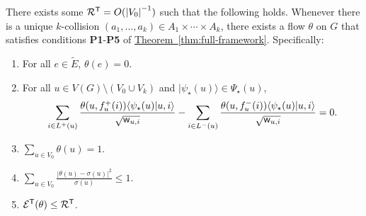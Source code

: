\documentclass{theoretics}
\newcommand{\thm}[1]{\hyperref[thm:#1]{Theorem~\ref*{thm:#1}}}
\def\ket#1{{\lvert}#1\rangle}
\renewcommand{\>}{\rangle}
\newcommand{\<}{\langle}
\renewcommand{\(}{\left(}
\renewcommand{\)}{\right)}
\def\braket#1#2{{{\langle}#1\vert}#2\rangle}
\def\abs#1{\left| #1 \right|}
\def\w{{\sf w}}
\begin{document}
\begin{lemma}\label{lem:k-dist-positive}
	There exists some ${\cal R}^{\sf T}=O(\abs{V_0}^{-1})$ such that the following holds. Whenever there is a unique $k$-collision $(a_1,\dots,a_k)\in A_1\times \cdots \times A_k$, there exists a flow $\theta$ on $G$ that satisfies conditions \textbf{P1}-\textbf{P5} of \thm{full-framework}. Specifically:
	\begin{enumerate}
		\item For all $e\in\tilde{E}$, $\theta(e)=0$.
		\item For all $u\in V(G)\setminus (V_0\cup V_k)$ and $\ket{\psi_\star(u)}\in \Psi_\star(u)$, 
		$$\sum_{i\in L^+(u)}\frac{\theta(u,f^+_u(i))\braket{\psi_\star(u)}{u,i}}{\sqrt{\w_{u,i}}}-\sum_{i\in L^-(u)}\frac{\theta(u,f^-_u(i))\braket{\psi_\star(u)}{u,i}}{\sqrt{\w_{u,i}}}=0.$$
		\item $\sum_{u\in  V_0}\theta(u)=1$.
		\item $\sum_{u\in V_0}\frac{|\theta(u)-\sigma(u)|^2}{\sigma(u)}\leq 1$.
		\item ${\cal E}^{\sf T}(\theta)\leq {\cal R}^{\sf T}$.
	\end{enumerate}
\end{lemma}
\end{document}
